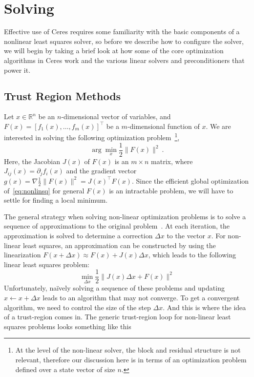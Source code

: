 \chapter{Solving}
Effective use of Ceres requires some familiarity with the basic components of a nonlinear least squares solver, so before we describe how to configure the solver, we will begin by taking a brief look at how some of the core optimization algorithms in Ceres work and the various linear solvers and preconditioners that power it.


\section{Trust Region Methods}
Let $x \in \mathbb{R}^{n}$ be an $n$-dimensional vector of variables, and
$ F(x) = \left[f_1(x),   \hdots,  f_{m}(x) \right]^{\top}$ be a $m$-dimensional function of $x$.  We are interested in solving the following optimization problem~\footnote{At the level of the non-linear solver, the block and residual structure is not relevant, therefore our discussion here is in terms of an optimization problem defined over a state vector of size $n$.},
\begin{equation}
        \arg \min_x \frac{1}{2}\|F(x)\|^2\ .
        \label{eq:nonlinsq}
\end{equation}
Here, the Jacobian $J(x)$ of $F(x)$ is an $m\times n$ matrix, where $J_{ij}(x) = \partial_j f_i(x)$  and the gradient vector $g(x) = \nabla  \frac{1}{2}\|F(x)\|^2 = J(x)^\top F(x)$. Since the efficient global optimization of~\eqref{eq:nonlinsq} for general $F(x)$ is an intractable problem, we will have to settle for finding a local minimum.

The general strategy when solving non-linear optimization problems is to solve a sequence of approximations to the original problem~\cite{nocedal2000numerical}. At each iteration, the approximation is solved to determine a correction $\Delta x$ to the vector $x$. For non-linear least squares, an approximation can be constructed by using the linearization $F(x+\Delta x) \approx F(x) + J(x)\Delta x$, which leads to the following linear least squares  problem:
\begin{equation}
         \min_{\Delta x} \frac{1}{2}\|J(x)\Delta x + F(x)\|^2
        \label{eq:linearapprox}
\end{equation}
Unfortunately, na\"ively solving a sequence of these problems and updating $x \leftarrow x+ \Delta x$ leads to an algorithm that may not converge.  To get a convergent algorithm, we need to control the size of the step $\Delta x$. And this is where the idea of a trust-region comes in. The generic trust-region loop for non-linear least squares problems looks something like this


